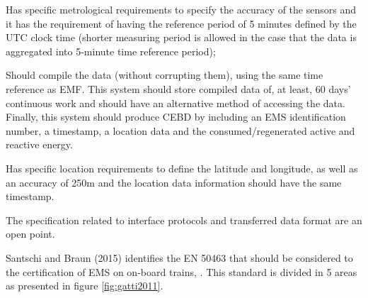 \begin{description}
	\setlength\itemsep{-0.5em}
	
	\item [Energy Measurement Function (EMF)] Has specific metrological requirements to specify the accuracy of the sensors and it has the requirement of having the reference period of 5 minutes defined by the UTC clock time (shorter measuring period is allowed in the case that the data is aggregated into 5-minute time reference period);
	
	\item [Data Handling System (DHS)] Should compile the data (without corrupting them), using the same time reference as \ac{EMF}. This system should store compiled data of, at least, 60 days' continuous work and should have an alternative method of accessing the data. Finally, this system should produce \ac{CEBD} by including an EMS identification number, a timestamp, a location data and the consumed/regenerated active and reactive energy.
	
	\item [Location function] Has specific location requirements to define the latitude and longitude, as well as an accuracy of 250m and the location data information should have the same timestamp.
	
	\item [On-board to ground communication] The specification related to interface protocols and transferred data format are an open point.
	
\end{description} 


	\newpage
	
 Santschi and Braun (2015) identifies the EN 50463 that should be considered to the certification of \ac{EMS} on on-board trains, \cite{metas2015}. This standard is divided in 5 areas as presented in figure \ref{fig:gatti2011}.
 



